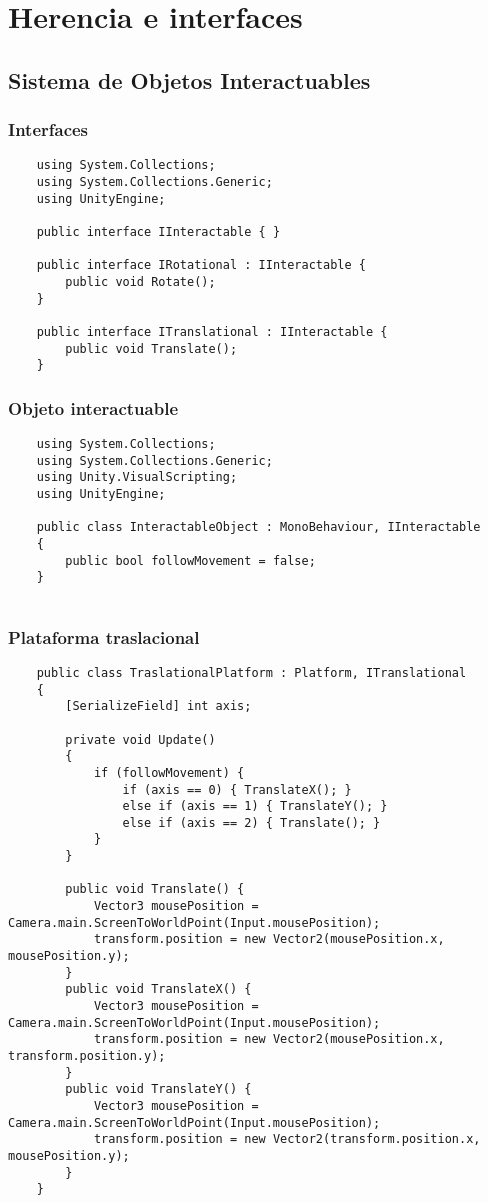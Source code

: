 \newpage

\section{Herencia e interfaces} \label{code:herencia}

\subsection{Sistema de Objetos Interactuables}

\subsubsection{Interfaces} 

\begin{lstlisting}
	using System.Collections;
	using System.Collections.Generic;
	using UnityEngine;
	
	public interface IInteractable { }
	
	public interface IRotational : IInteractable {
		public void Rotate();
	}
	
	public interface ITranslational : IInteractable {
		public void Translate();
	}
\end{lstlisting}

\subsubsection{Objeto interactuable}

\begin{lstlisting}
	using System.Collections;
	using System.Collections.Generic;
	using Unity.VisualScripting;
	using UnityEngine;
	
	public class InteractableObject : MonoBehaviour, IInteractable
	{
		public bool followMovement = false;
	}
	
\end{lstlisting}

\subsubsection{Plataforma traslacional}

\begin{lstlisting}
	public class TraslationalPlatform : Platform, ITranslational
	{
		[SerializeField] int axis;
		
		private void Update()
		{
			if (followMovement) {
				if (axis == 0) { TranslateX(); } 
				else if (axis == 1) { TranslateY(); } 
				else if (axis == 2) { Translate(); } 
			}
		}
		
		public void Translate() {
			Vector3 mousePosition = Camera.main.ScreenToWorldPoint(Input.mousePosition);
			transform.position = new Vector2(mousePosition.x, mousePosition.y);
		}
		public void TranslateX() { 
			Vector3 mousePosition = Camera.main.ScreenToWorldPoint(Input.mousePosition);
			transform.position = new Vector2(mousePosition.x, transform.position.y);
		}
		public void TranslateY() {
			Vector3 mousePosition = Camera.main.ScreenToWorldPoint(Input.mousePosition);
			transform.position = new Vector2(transform.position.x, mousePosition.y);
		}
	}
\end{lstlisting}

